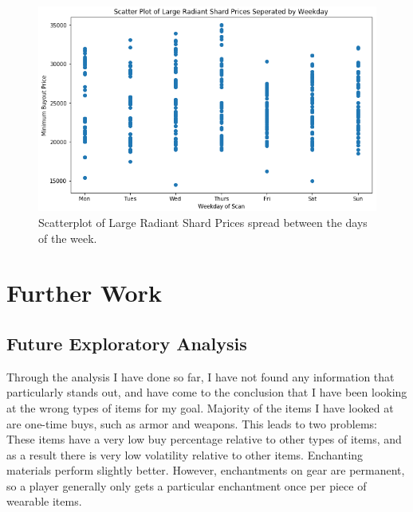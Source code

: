 \documentclass[sigconf]{acmart}
\begin{document}
\begin{figure}[h]
  \centering
  \includegraphics[width=\linewidth]{LRS_Weekly}
  \caption{Scatterplot of Large Radiant Shard Prices spread between the days of the week.}
\end{figure}

\section{Further Work}

\subsection{Future Exploratory Analysis}

	Through the analysis I have done so far, I have not found any information that particularly stands out, and have come to the conclusion that I have been looking at the wrong types of items for my goal. Majority of the items I have looked at are one-time buys, such as armor and weapons. This leads to two problems: These items have a very low buy percentage relative to other types of items, and as a result there is very low volatility relative to other items. Enchanting materials perform slightly better. However, enchantments on gear are permanent, so a player generally only gets a particular enchantment once per piece of wearable items.
\end{document}
